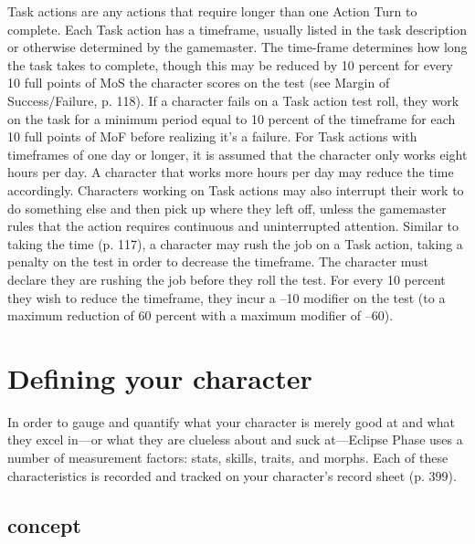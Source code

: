 Task actions are any actions that require longer than one Action Turn to complete. Each Task action has a timeframe, usually listed in the task description or otherwise determined by the gamemaster. The time-frame determines how long the task takes to complete, though this may be reduced by 10 percent for every 10 full points of MoS the character scores on the test (see Margin of Success/Failure, p. 118). If a character fails on a Task action test roll, they work on the task for a minimum period equal to 10 percent of the timeframe for each 10 full points of MoF before realizing it's a failure. For Task actions with timeframes of one day or longer, it is assumed that the character only works eight hours per day. A character that works more hours per day may reduce the time accordingly. Characters working on Task actions may also interrupt their work to do something else and then pick up where they left off, unless the gamemaster rules that the action requires continuous and uninterrupted attention. Similar to taking the time (p. 117), a character may rush the job on a Task action, taking a penalty on the test in order to decrease the timeframe. The character must declare they are rushing the job before they roll the test. For every 10 percent they wish to reduce the timeframe, they incur a –10 modifier on the test (to a maximum reduction of 60 percent with a maximum modifier of –60). 

\section{Defining your character} \label{sec:defin-your-char} 

In order to gauge and quantify what your character is merely good at and what they excel in—or what they are clueless about and suck at—Eclipse Phase uses a number of measurement factors: stats, skills, traits, and morphs. Each of these characteristics is recorded and tracked on your character's record sheet (p. 399). 

\subsection{concept} \label{sec:concept} 

